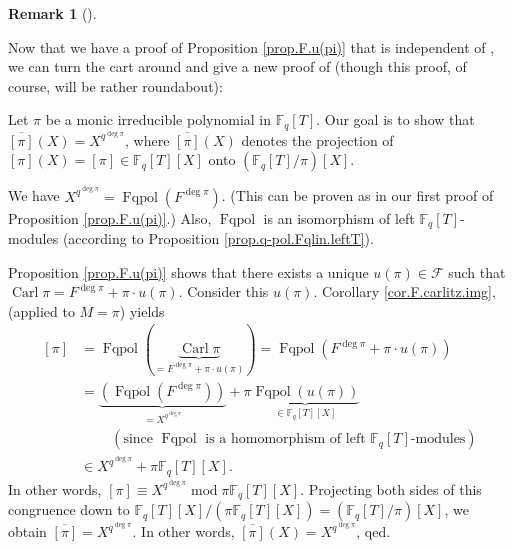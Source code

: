 \documentclass[numbers=enddot,12pt,final,onecolumn,notitlepage]{scrartcl}%
\theoremstyle{definition}
\newtheorem{remk}[theo]{Remark}
\newenvironment{remark}[1][]
{\begin{remk}[#1]\begin{leftbar}}
{\end{leftbar}\end{remk}}
\begin{document}
\begin{remark}
Now that we have a proof of Proposition \ref{prop.F.u(pi)} that is independent
of \cite[Theorem 2.11]{kc-carlitz}, we can turn the cart around and give a new
proof of \cite[Theorem 2.11, last equality]{kc-carlitz} (though this proof, of
course, will be rather roundabout):

Let $\pi$ be a monic irreducible polynomial in $\mathbb{F}_{q}\left[
T\right]  $. Our goal is to show that $\overline{\left[  \pi\right]  }\left(
X\right)  =X^{q^{\deg\pi}}$, where $\overline{\left[  \pi\right]  }\left(
X\right)  $ denotes the projection of $\left[  \pi\right]  \left(  X\right)
=\left[  \pi\right]  \in\mathbb{F}_{q}\left[  T\right]  \left[  X\right]  $
onto $\left(  \mathbb{F}_{q}\left[  T\right]  /\pi\right)  \left[  X\right]  $.

We have $X^{q^{\deg\pi}}=\operatorname*{Fqpol}\left(  F^{\deg\pi}\right)  $.
(This can be proven as in our first proof of Proposition \ref{prop.F.u(pi)}.)
Also, $\operatorname*{Fqpol}$ is an isomorphism of left $\mathbb{F}_{q}\left[
T\right]  $-modules (according to Proposition \ref{prop.q-pol.Fqlin.leftT}).

Proposition \ref{prop.F.u(pi)} shows that there exists a unique $u\left(
\pi\right)  \in\mathcal{F}$ such that $\operatorname*{Carl}\pi=F^{\deg\pi}%
+\pi\cdot u\left(  \pi\right)  $. Consider this $u\left(  \pi\right)  $.
Corollary \ref{cor.F.carlitz.img}, (applied to $M=\pi$) yields
\begin{align*}
\left[  \pi\right]   &  =\operatorname*{Fqpol}\left(
\underbrace{\operatorname*{Carl}\pi}_{=F^{\deg\pi}+\pi\cdot u\left(
\pi\right)  }\right)  =\operatorname*{Fqpol}\left(  F^{\deg\pi}+\pi\cdot
u\left(  \pi\right)  \right) \\
&  =\underbrace{\left(  \operatorname*{Fqpol}\left(  F^{\deg\pi}\right)
\right)  }_{=X^{q^{\deg\pi}}}+\pi\underbrace{\operatorname*{Fqpol}\left(
u\left(  \pi\right)  \right)  }_{\in\mathbb{F}_{q}\left[  T\right]  \left[
X\right]  }\\
&  \ \ \ \ \ \ \ \ \ \ \left(  \text{since }\operatorname*{Fqpol}\text{ is a
homomorphism of left }\mathbb{F}_{q}\left[  T\right]  \text{-modules}\right)
\\
&  \in X^{q^{\deg\pi}}+\pi\mathbb{F}_{q}\left[  T\right]  \left[  X\right]  .
\end{align*}
In other words, $\left[  \pi\right]  \equiv X^{q^{\deg\pi}}\operatorname{mod}%
\pi\mathbb{F}_{q}\left[  T\right]  \left[  X\right]  $. Projecting both sides
of this congruence down to $\mathbb{F}_{q}\left[  T\right]  \left[  X\right]
/\left(  \pi\mathbb{F}_{q}\left[  T\right]  \left[  X\right]  \right)
=\left(  \mathbb{F}_{q}\left[  T\right]  /\pi\right)  \left[  X\right]  $, we
obtain $\overline{\left[  \pi\right]  }=X^{q^{\deg\pi}}$. In other words,
$\overline{\left[  \pi\right]  }\left(  X\right)  =X^{q^{\deg\pi}}$, qed.
\end{remark}
\end{document}
